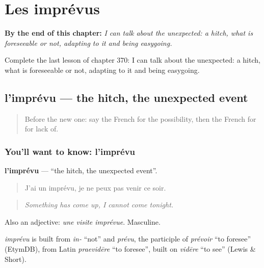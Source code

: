 
\chapter{Les imprévus}
\label{ch:fr-les-imprevus}

\begin{chapteropening}
\textbf{By the end of this chapter:} \emph{I can talk about the unexpected: a hitch, what is foreseeable or not, adapting to it and being easygoing.}

Complete the last lesson of chapter 370: I can talk about the unexpected: a hitch, what is foreseeable or not, adapting to it and being easygoing.
\end{chapteropening}

\section[l'imprévu]{l'imprévu — the hitch, the unexpected event}

\label{lesson:FR-C370-imprevu}



\begin{quote}
Before the new one: say the French for the possibility, then the French for for lack of.
\end{quote}

\subsection*{You'll want to know: l'imprévu}
\textbf{l'imprévu} — \textquotedblleft{}the hitch, the unexpected event\textquotedblright{}.

\begin{quote}
J'ai un imprévu, je ne peux pas venir ce soir.
\end{quote}

\begin{quote}
\emph{Something has come up, I cannot come tonight.}
\end{quote}

Also an adjective: \emph{une visite imprévue}. Masculine.

\begin{cousinweb}
\emph{imprévu} is built from \emph{in-} \textquotedblleft{}not\textquotedblright{} and \emph{prévu}, the participle of \emph{prévoir} \textquotedblleft{}to foresee\textquotedblright{} (EtymDB), from Latin \emph{praevidēre} \textquotedblleft{}to foresee\textquotedblright{}, built on \emph{vidēre} \textquotedblleft{}to see\textquotedblright{} (Lewis \& Short).
\end{cousinweb}

